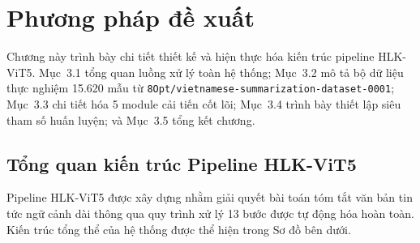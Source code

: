 \chapter{Phương pháp đề xuất}

Chương này trình bày chi tiết thiết kế và hiện thực hóa kiến trúc pipeline HLK-ViT5.
Mục~3.1 tổng quan luồng xử lý toàn hệ thống;
Mục~3.2 mô tả bộ dữ liệu thực nghiệm 15.620 mẫu từ \texttt{8Opt/vietnamese-summarization-dataset-0001};
Mục~3.3 chi tiết hóa 5 module cải tiến cốt lõi;
Mục~3.4 trình bày thiết lập siêu tham số huấn luyện; và Mục~3.5 tổng kết chương.

\section{Tổng quan kiến trúc Pipeline HLK-ViT5}

Pipeline HLK-ViT5 được xây dựng nhằm giải quyết bài toán tóm tắt văn bản tin tức ngữ cảnh dài thông qua quy trình xử lý 13 bước được tự động hóa hoàn toàn. Kiến trúc tổng thể của hệ thống được thể hiện trong Sơ đồ bên dưới.

